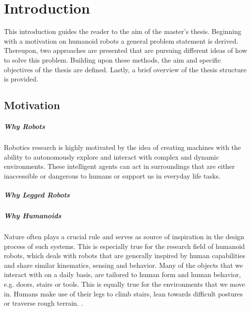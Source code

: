 
\chapter{Introduction}\label{c1}
This introduction guides the reader to the aim of the master's thesis. Beginning
with a motivation on humanoid robots a general problem statement is derived. Thereupon,
two approaches are presented that are pursuing different ideas of how to solve
this problem. Building upon these methods, the aim and specific objectives of the
thesis are defined. Lastly, a brief overview of the thesis structure is provided.

\section{Motivation}
\paragraph{Why Robots}
Robotics research is highly motivated by the idea of creating machines with the ability to autonomously explore and interact with complex and dynamic environments. These intelligent agents can act in surroundings that are either inaccessible or dangerous to humans or support us in everyday life tasks.
\paragraph{Why Legged Robots} 
\paragraph{Why Humanoids}
Nature often plays a crucial rule and serves as source of inspiration in the design process of such systems. This is especially true for the research field of humanoid robots, which deals with robots that are generally inspired by human capabilities and share similar kinematics, sensing and behavior. Many of the objects that we interact with on a daily basis, are tailored to human form and human behavior, e.g. doors, stairs or tools. This is equally true for the environments that we move in. Humans make use of their legs to climb stairs, lean towards difficult postures or traverse rough terrain. \cite[Ch.\ 67]{siciliano2016springer}. 
